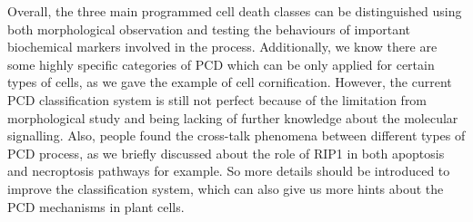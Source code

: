 Overall, the three main programmed cell death classes can be distinguished using both morphological observation and testing the behaviours of important biochemical markers involved in the process. Additionally, we know there are some highly specific categories of PCD which can be only applied for certain types of cells, as we gave the example of cell cornification. However, the current PCD classification system is still not perfect because of the limitation from morphological study and being lacking of further knowledge about the molecular signalling. Also, people found the cross-talk phenomena between different types of PCD process, as we briefly discussed about the role of RIP1 in both apoptosis and necroptosis pathways for example. So more details should be introduced to improve the classification system, which can also give us more hints about the PCD mechanisms in plant cells.
